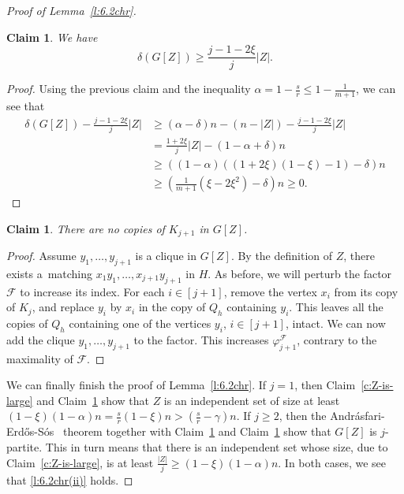 \documentclass[reqno, 12pt]{amsart}
\numberwithin{equation}{section}
\numberwithin{figure}{section}
\theoremstyle{plain}
\newtheorem{claim}[thm]{Claim}
\theoremstyle{definition}
\let\phi=\varphi
\def\cF{{\mathcal F}}
\begin{document}
\begin{proof}[Proof of Lemma~\ref{l:6.2chr}]
        \begin{claim}
            \label{c:Z-has-high-mindegree}
            We have
            \[\delta(G[Z])\geq\frac{j-1-2\xi}{j}|Z|.\]
        \end{claim}
        \begin{proof}
            Using the previous claim and the inequality $\alpha =1-\frac{s}{r}\leq 1-\frac{1}{m+1}$, we can see that
            \begin{align*}
                \delta(G[Z]) - \frac{j-1-2\xi}{j}|Z| &\geq (\alpha-\delta)n-(n-|Z|)-\frac{j-1-2\xi}{j}|Z|\\
                &=\frac{1+2\xi}{j}|Z|-(1-\alpha+\delta)n\\
                &\geq \left((1-\alpha)((1+2\xi)(1-\xi)-1)-\delta\right)n\\
                &\geq \left(\frac{1}{m+1}(\xi-2\xi^2)-\delta\right)n\geq 0.
            \end{align*}
        \end{proof}

        \begin{claim}
            \label{c:no-K_(j+1)-in-Z}
            There are no copies of $K_{j+1}$ in $G[Z]$.
        \end{claim}
        \begin{proof}
        Assume $y_1,\dots, y_{j+1}$ is a clique in $G[Z]$. By the definition of $Z$, there exists a~matching $x_1y_1,\dots , x_{j+1}y_{j+1}$ in $H$. As before, we will perturb the factor $\cF$ to increase its index. For each $i\in [j+1]$, remove the vertex $x_i$ from its copy of $K_j$, and  replace $y_i$ by $x_i$ in the copy of $Q_h$ containing $y_i$. This leaves all the copies of $Q_h$ containing one of the vertices $y_i$, $i\in[j+1]$, intact. We can now add the clique $y_1,\dots, y_{j+1}$ to the factor. This increases $\phi_{j+1}^\cF$,  contrary to the maximality of $\cF$.
        \end{proof}

        We can finally finish the proof of Lemma~\ref{l:6.2chr}.
        If $j=1$, then Claim~\ref{c:Z-is-large} and Claim~\ref{c:no-K_(j+1)-in-Z} show that $Z$ is an independent set of size at least $(1-\xi)(1-\alpha)n=\frac{s}{r}(1-\xi)n>(\frac{s}{r}-\gamma)n$. If $j\geq 2$, then the Andr\'asfari-Erd\H{o}s-S\'os~\cite{aes74} theorem together with Claim~\ref{c:Z-has-high-mindegree} and Claim~\ref{c:no-K_(j+1)-in-Z} show that $G[Z]$ is $j$-partite. This in turn means that there is an independent set whose size, due to Claim~\ref{c:Z-is-large}, is at least $\frac{|Z|}{j}\geq (1-\xi)(1-\alpha)n$. In both cases, we see that \ref{l:6.2chr(ii)} holds.
    \end{proof}  
    
\end{document}
